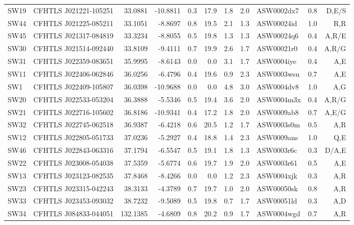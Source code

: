 \documentclass[useAMS,usenatbib,a4paper]{mn2e}
\begin{document}
\begin{center}
\begin{longtable}{llrrrrrrlrr}
SW19 & CFHTLS J021221-105251 &   33.0881 &  -10.8811 &  0.3 & 17.9 &  1.8 &  2.0 & ASW0002dx7 &  0.8  &  D,E/S   \\
SW44 & CFHTLS J021225-085211 &   33.1051 &   -8.8697 &  0.8 & 19.5 &  2.1 &  1.3 & ASW00024id &  1.0  &  R,R   \\
SW45 & CFHTLS J021317-084819 &   33.3234 &   -8.8055 &  0.5 & 19.8 &  1.3 &  1.3 & ASW00024q6 &  0.4  &  A,R/E   \\
SW30 & CFHTLS J021514-092440 &   33.8109 &   -9.4111 &  0.7 & 19.9 &  2.6 &  1.7 & ASW00021r0 &  0.4  &  A,R/G   \\
SW31 & CFHTLS J022359-083651 &   35.9995 &   -8.6143 &  0.0 &  0.0 &  3.1 &  1.7 & ASW0004iye &  0.4  &  A,E   \\
SW11 & CFHTLS J022406-062846 &   36.0256 &   -6.4796 &  0.4 & 19.6 &  0.9 &  2.3 & ASW0003wsu &  0.7  &  A,E   \\
 SW1 & CFHTLS J022409-105807 &   36.0398 &  -10.9688 &  0.0 &  0.0 &  4.8 &  3.0 & ASW0004dv8 &  1.0  &  A,G   \\
SW20 & CFHTLS J022533-053204 &   36.3888 &   -5.5346 &  0.5 & 19.4 &  3.6 &  2.0 & ASW0004m3x &  0.4  &  A,R/G   \\
SW21 & CFHTLS J022716-105602 &   36.8186 &  -10.9341 &  0.4 & 17.2 &  1.8 &  2.0 & ASW0009ab8 &  0.7  &  A,E/G   \\
SW32 & CFHTLS J022745-062518 &   36.9387 &   -6.4218 &  0.6 & 20.5 &  1.2 &  1.7 & ASW0003s0m &  0.5  &  A,R   \\
SW12 & CFHTLS J022805-051733 &   37.0236 &   -5.2927 &  0.4 & 18.8 &  1.4 &  2.3 & ASW0009ans &  1.0  &  Q,E   \\
SW46 & CFHTLS J022843-063316 &   37.1794 &   -6.5547 &  0.5 & 19.1 &  1.8 &  1.3 & ASW0003r6c &  0.3  &  D/A,E   \\
SW22 & CFHTLS J023008-054038 &   37.5359 &   -5.6774 &  0.6 & 19.7 &  1.9 &  2.0 & ASW0003r61 &  0.5  &  A,E   \\
SW13 & CFHTLS J023123-082535 &   37.8468 &   -8.4266 &  0.0 &  0.0 &  1.2 &  2.3 & ASW0004xjk &  0.3  &  A,R   \\
SW23 & CFHTLS J023315-042243 &   38.3133 &   -4.3789 &  0.7 & 19.7 &  1.0 &  2.0 & ASW00050sk &  0.8  &  A,R   \\
SW33 & CFHTLS J023453-093032 &   38.7232 &   -9.5089 &  0.5 & 19.8 &  0.7 &  1.7 & ASW00051ld &  0.3  &  A,D   \\
SW34 & CFHTLS J084833-044051 &  132.1385 &   -4.6809 &  0.8 & 20.2 &  0.9 &  1.7 & ASW0004wgd &  0.7  &  A,R   \\

\end{longtable}
\end{center}
\end{document}
